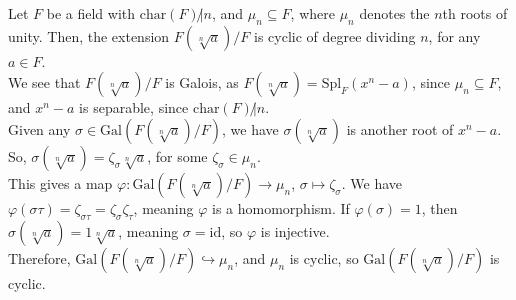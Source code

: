 \documentclass[10pt]{extarticle}
\begin{document}
  Let $F$ be a field with $\text{char}(F)\not| n$, and $\mathbb{\mu}_n \subseteq F$, where $\mathbb{\mu}_n$ denotes the $n$th roots of unity. Then, the extension $F(\sqrt[n]{a})/F$ is cyclic of degree dividing $n$, for any $a\in F$.\\

  We see that $F(\sqrt[n]{a})/F$ is Galois, as $F(\sqrt[n]{a}) = \text{Spl}_{F}(x^n - a)$, since $\mathbb{\mu}_n \subseteq F$, and $x^n - a$ is separable, since $\text{char}(F)\not| n$.\\

  Given any $\sigma \in \text{Gal}\left(F(\sqrt[n]{a})/F\right)$, we have $\sigma(\sqrt[n]{a})$ is another root of $x^n - a$. So, $\sigma(\sqrt[n]{a}) = \zeta_{\sigma}\sqrt[n]{a}$, for some $\zeta_{\sigma}\in \mathbb{\mu}_n$.\\

  This gives a map $\varphi: \text{Gal}\left(F(\sqrt[n]{a})/F\right)\rightarrow \mathbb{\mu}_n$, $\sigma \mapsto \zeta_{\sigma}$. We have $\varphi(\sigma\tau) = \zeta_{\sigma\tau} = \zeta_{\sigma}\zeta_{\tau}$, meaning $\varphi$ is a homomorphism. If $\varphi(\sigma) = 1$, then $\sigma(\sqrt[n]{a}) = 1\sqrt[n]{a}$, meaning $\sigma = \text{id}$, so $\varphi$ is injective.\\

  Therefore, $\text{Gal}\left(F(\sqrt[n]{a})/F\right)\hookrightarrow \mathbb{\mu}_n$, and $\mathbb{\mu}_n$ is cyclic, so $\text{Gal}\left(F(\sqrt[n]{a})/F\right)$ is cyclic.
\end{document}
